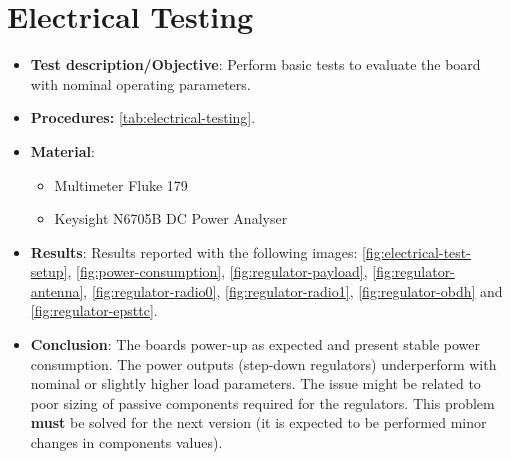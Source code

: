 \section{Electrical Testing}

\begin{itemize}
    \item \textbf{Test description/Objective}: Perform basic tests to evaluate the board with nominal operating parameters.
    \item \textbf{Procedures:} \autoref{tab:electrical-testing}.
    \item \textbf{Material}:
        \begin{itemize}
            \item Multimeter Fluke 179
            \item Keysight N6705B DC Power Analyser
        \end{itemize}
    \item \textbf{Results}: Results reported with the following images: \ref{fig:electrical-test-setup}, \ref{fig:power-consumption}, \ref{fig:regulator-payload}, \ref{fig:regulator-antenna}, \ref{fig:regulator-radio0}, \ref{fig:regulator-radio1}, \ref{fig:regulator-obdh} and \ref{fig:regulator-epsttc}. 
    \item \textbf{Conclusion}: The boards power-up as expected and present stable power consumption. The power outputs (step-down regulators) underperform with nominal or slightly higher load parameters. The issue might be related to poor sizing of passive components required for the regulators. This problem \textbf{must} be solved for the next version (it is expected to be performed minor changes in components values).  
\end{itemize}

